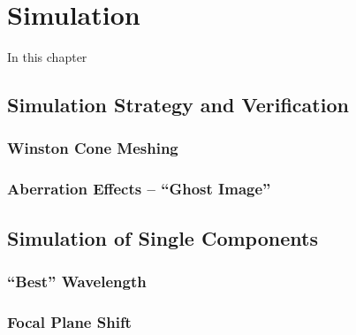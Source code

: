 \chapter{\iceact Simulation}\label{chap:iceact_sim}

In this chapter

\section{Simulation Strategy and Verification}

\subsection{Winston Cone Meshing}\label{sec:wico_meshing}

\subsection{Aberration Effects -- \enquote{Ghost Image}}\label{sec:ghost_image}

\section{Simulation of Single Components}

\subsection{\enquote{Best} Wavelength}

\subsection{Focal Plane Shift}